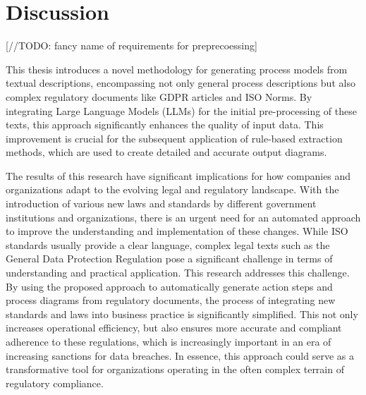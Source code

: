 \chapter{Discussion}
\label{sec:discussion}



[//TODO: fancy name of requirements for preprecoessing]

This thesis introduces a novel methodology for generating process models from textual descriptions, encompassing not only general process descriptions but also complex regulatory documents like GDPR articles and ISO Norms. By integrating Large Language Models (LLMs) for the initial pre-processing of these texts, this approach significantly enhances the quality of input data. This improvement is crucial for the subsequent application of rule-based extraction methods, which are used to create detailed and accurate output diagrams.








The results of this research have significant implications for how companies and organizations adapt to the evolving legal and regulatory landscape. With the introduction of various new laws and standards by different government institutions and organizations, there is an urgent need for an automated approach to improve the understanding and implementation of these changes. While ISO standards usually provide a clear language, complex legal texts such as the General Data Protection Regulation pose a significant challenge in terms of understanding and practical application. This research addresses this challenge. By using the proposed approach to automatically generate action steps and process diagrams from regulatory documents, the process of integrating new standards and laws into business practice is significantly simplified. This not only increases operational efficiency, but also ensures more accurate and compliant adherence to these regulations, which is increasingly important in an era of increasing sanctions for data breaches.  In essence, this approach could serve as a transformative tool for organizations operating in the often complex terrain of regulatory compliance.

